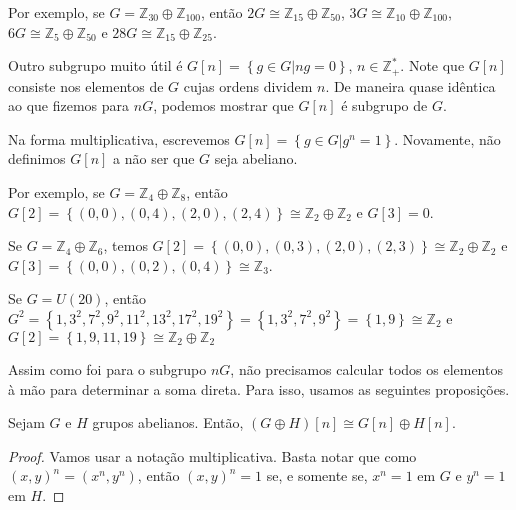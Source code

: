 	\par\vspace{0.3cm} Por exemplo, se $G = \mathbb{Z}_{30}\oplus\mathbb{Z}_{100}$, então $2G \cong \mathbb{Z}_{15}\oplus\mathbb{Z}_{50}$, $3G \cong \mathbb{Z}_{10}\oplus\mathbb{Z}_{100}$, $6G \cong \mathbb{Z}_5\oplus\mathbb{Z}_{50}$ e $28G \cong \mathbb{Z}_{15}\oplus\mathbb{Z}_{25}$.
	\par\vspace{0.3cm} Outro subgrupo muito útil é $G[n] = \left\{ g\in G\vert ng=0 \right\}$, $n\in\mathbb{Z}_+^\ast$. Note que $G[n]$ consiste nos elementos de $G$ cujas ordens dividem $n$. De maneira quase idêntica ao que fizemos para $nG$, podemos mostrar que $G[n]$ é subgrupo de $G$.
	\par\vspace{0.3cm} Na forma multiplicativa, escrevemos $G[n] = \left\{ g\in G\vert g^n=1 \right\}$. Novamente, não definimos $G[n]$ a não ser que $G$ seja abeliano. 
	\par\vspace{0.3cm} Por exemplo, se $G = \mathbb{Z}_4\oplus\mathbb{Z}_8$, então $G[2] = \left\{ (0,0), (0,4), (2,0), (2,4) \right\}\cong\mathbb{Z}_2\oplus\mathbb{Z}_2$ e $G[3] = 0$. 
	\par\vspace{0.3cm} Se $G = \mathbb{Z}_4\oplus\mathbb{Z}_6$, temos $G[2] = \left\{ (0,0), (0,3), (2,0), (2,3) \right\}\cong \mathbb{Z}_2\oplus\mathbb{Z}_2$ e $G[3] = \left\{ (0,0), (0,2), (0,4) \right\}\cong\mathbb{Z}_3$.
	\par\vspace{0.3cm} Se $G = U(20)$, então $G^2 = \left\{ 1, 3^2, 7^2, 9^2, 11^2, 13^2, 17^2, 19^2 \right\} = \left\{ 1, 3^2, 7^2, 9^2 \right\} = \left\{ 1, 9 \right\}\cong\mathbb{Z}_2$ e $G[2] = \left\{ 1,9,11,19 \right\}\cong\mathbb{Z}_2\oplus\mathbb{Z}_2$
	\par\vspace{0.3cm} Assim como foi para o subgrupo $nG$, não precisamos calcular todos os elementos à mão para determinar a soma direta. Para isso, usamos as seguintes proposições.
	
	\begin{prop}
		\label{subgrupo abeliano G[n]}
		Sejam $G$ e $H$ grupos abelianos. Então, $(G\oplus H)[n] \cong G[n]\oplus H[n]$.
	\end{prop}
	\begin{proof}
		Vamos usar a notação multiplicativa. Basta notar que como $(x,y)^n = (x^n, y^n)$, então $(x,y)^n = 1$ se, e somente se, $x^n = 1$ em $G$ e $y^n = 1$ em $H$. 
	\end{proof}
	
